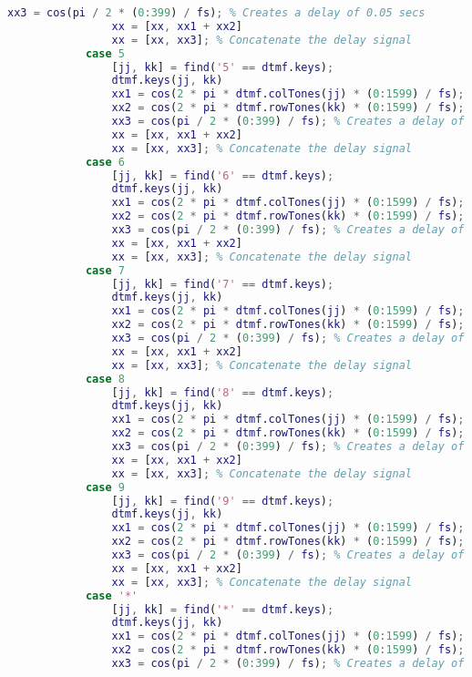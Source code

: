 \begin{lstlisting}[language=Matlab]
                xx3 = cos(pi / 2 * (0:399) / fs); % Creates a delay of 0.05 secs
                xx = [xx, xx1 + xx2]
                xx = [xx, xx3]; % Concatenate the delay signal
            case 5
                [jj, kk] = find('5' == dtmf.keys);
                dtmf.keys(jj, kk)
                xx1 = cos(2 * pi * dtmf.colTones(jj) * (0:1599) / fs);
                xx2 = cos(2 * pi * dtmf.rowTones(kk) * (0:1599) / fs);
                xx3 = cos(pi / 2 * (0:399) / fs); % Creates a delay of 0.05 secs
                xx = [xx, xx1 + xx2]
                xx = [xx, xx3]; % Concatenate the delay signal
            case 6
                [jj, kk] = find('6' == dtmf.keys);
                dtmf.keys(jj, kk)
                xx1 = cos(2 * pi * dtmf.colTones(jj) * (0:1599) / fs);
                xx2 = cos(2 * pi * dtmf.rowTones(kk) * (0:1599) / fs);
                xx3 = cos(pi / 2 * (0:399) / fs); % Creates a delay of 0.05 secs
                xx = [xx, xx1 + xx2]
                xx = [xx, xx3]; % Concatenate the delay signal
            case 7
                [jj, kk] = find('7' == dtmf.keys);
                dtmf.keys(jj, kk)
                xx1 = cos(2 * pi * dtmf.colTones(jj) * (0:1599) / fs);
                xx2 = cos(2 * pi * dtmf.rowTones(kk) * (0:1599) / fs);
                xx3 = cos(pi / 2 * (0:399) / fs); % Creates a delay of 0.05 secs
                xx = [xx, xx1 + xx2]
                xx = [xx, xx3]; % Concatenate the delay signal
            case 8
                [jj, kk] = find('8' == dtmf.keys);
                dtmf.keys(jj, kk)
                xx1 = cos(2 * pi * dtmf.colTones(jj) * (0:1599) / fs);
                xx2 = cos(2 * pi * dtmf.rowTones(kk) * (0:1599) / fs);
                xx3 = cos(pi / 2 * (0:399) / fs); % Creates a delay of 0.05 secs
                xx = [xx, xx1 + xx2]
                xx = [xx, xx3]; % Concatenate the delay signal
            case 9
                [jj, kk] = find('9' == dtmf.keys);
                dtmf.keys(jj, kk)
                xx1 = cos(2 * pi * dtmf.colTones(jj) * (0:1599) / fs);
                xx2 = cos(2 * pi * dtmf.rowTones(kk) * (0:1599) / fs);
                xx3 = cos(pi / 2 * (0:399) / fs); % Creates a delay of 0.05 secs
                xx = [xx, xx1 + xx2]
                xx = [xx, xx3]; % Concatenate the delay signal
            case '*'
                [jj, kk] = find('*' == dtmf.keys);
                dtmf.keys(jj, kk)
                xx1 = cos(2 * pi * dtmf.colTones(jj) * (0:1599) / fs);
                xx2 = cos(2 * pi * dtmf.rowTones(kk) * (0:1599) / fs);
                xx3 = cos(pi / 2 * (0:399) / fs); % Creates a delay of 0.05 secs

\end{lstlisting}
